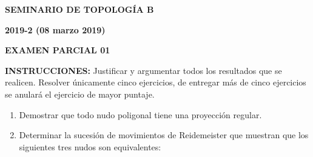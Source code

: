 \documentclass[12pt]{report}
\begin{document}
\begin{center}
\textbf{\LARGE {SEMINARIO DE TOPOLOGÍA B}}
\end{center}

\begin{center}
\textbf{{\large 2019-2 (08 marzo 2019)}}
\end{center}

\begin{center}
\textbf{{\large EXAMEN PARCIAL 01}}
\end{center}

{\bf INSTRUCCIONES:} Justificar y argumentar todos los resultados que se realicen. Resolver únicamente cinco ejercicios, de entregar más de cinco ejercicios se anulará el ejercicio de mayor puntaje.

\begin{enumerate}
\item Demostrar que todo nudo poligonal tiene una proyección regular.

\item Determinar la sucesión de movimientos de Reidemeister que muestran que los siguientes tres nudos son equivalentes:


\end{enumerate}
\end{document}
